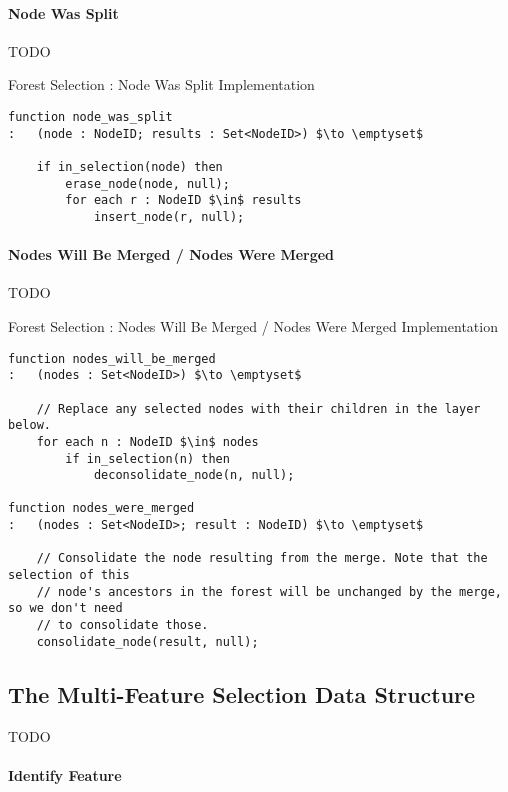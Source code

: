 \paragraph{Node Was Split}

TODO

\begin{stulisting}[p]
\caption{Forest Selection : Node Was Split Implementation}
\label{code:ipfs-selection-nodewassplit}
\begin{lstlisting}[style=Default]
function node_was_split
:	(node : NodeID; results : Set<NodeID>) $\to \emptyset$

	if in_selection(node) then
		erase_node(node, null);
		for each r : NodeID $\in$ results
			insert_node(r, null);
\end{lstlisting}
\end{stulisting}

\paragraph{Nodes Will Be Merged / Nodes Were Merged}

TODO

\begin{stulisting}[p]
\caption{Forest Selection : Nodes Will Be Merged / Nodes Were Merged Implementation}
\label{code:ipfs-selection-nodesmerged}
\begin{lstlisting}[style=Default]
function nodes_will_be_merged
:	(nodes : Set<NodeID>) $\to \emptyset$

	// Replace any selected nodes with their children in the layer below.
	for each n : NodeID $\in$ nodes
		if in_selection(n) then
			deconsolidate_node(n, null);

function nodes_were_merged
:	(nodes : Set<NodeID>; result : NodeID) $\to \emptyset$

	// Consolidate the node resulting from the merge. Note that the selection of this
	// node's ancestors in the forest will be unchanged by the merge, so we don't need
	// to consolidate those.
	consolidate_node(result, null);
\end{lstlisting}
\end{stulisting}

\subsection{The Multi-Feature Selection Data Structure}

TODO

\paragraph{Identify Feature}

